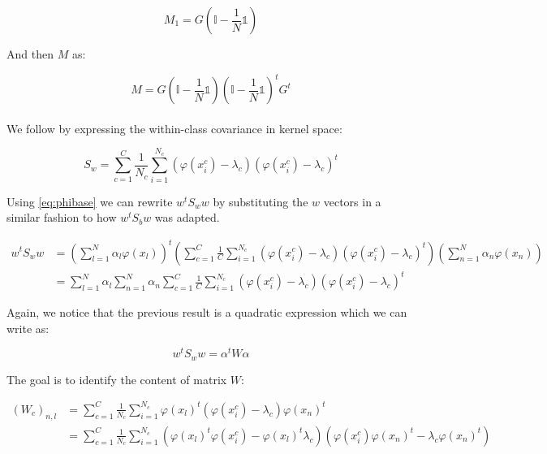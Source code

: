 $$M_1 = G\left( \mathds{I} - \frac{1}{N}\mathds{1} \right)$$

And then $M$ as:

$$M = G\left( \mathds{I} - \frac{1}{N} \mathds{1} \right)\left( \mathds{I} - \frac{1}{N} \mathds{1}\right)^tG^t$$

\paragraph{}
We follow by expressing the within-class covariance in kernel space:

\begin{equation*}
S_w = \sum_{c = 1}^C \frac{1}{N_c} \sum_{i = 1}^{N_c} (\varphi(x_i^c) - \lambda_c)(\varphi(x_i^c) -
\lambda_c)^t
\end{equation*}

Using \ref{eq:phibase} we can rewrite $w^tS_ww$ by substituting the $w$ vectors in a similar fashion
to how $w^tS_bw$ was adapted.

\begin{align*}
  w^tS_ww &= \left( \sum_{l=1}^N \alpha_l \varphi(x_l)\right)^t
             \left( \sum_{c=1}^C \frac{1}{C}
                       \sum_{i=1}^{N_c} (\varphi(x_i^c) - \lambda_c)
                                        (\varphi(x_i^c) - \lambda_c)^t\right)
             \left( \sum_{n=1}^N \alpha_n \varphi(x_n)\right)\\
          &= \sum_{l=1}^N \alpha_l \sum_{n=1}^N \alpha_n \sum_{c=1}^C \frac{1}{C}
                \sum_{i=1}^{N_c} (\varphi(x_i^c) - \lambda_c)
                                 (\varphi(x_i^c) - \lambda_c)^t
\end{align*}

Again, we notice that the previous result is a quadratic expression which we can write as:

\begin{equation*}
w^tS_ww = \alpha^tW\alpha
\end{equation*}

The goal is to identify the content of matrix $W$:

\begin{align*}
  (W_c)_{n,l} &= \sum_{c=1}^C \frac{1}{N_c} \sum_{i=1}^{N_c}
                  \varphi(x_l)^t(\varphi(x_i^c) - \lambda_c)\varphi(x_n)^t \\
            &= \sum_{c=1}^C \frac{1}{N_c} \sum_{i=1}^{N_c} (\varphi(x_l)^t\varphi(x_i^c) -
            \varphi(x_l)^t\lambda_c) (\varphi(x_i^c)\varphi(x_n)^t -
            \lambda_c \varphi(x_n)^t)
\end{align*}

